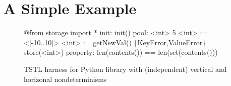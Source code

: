 \begin{comment}
\subsection{Tools for Nondeterministic Delta-Debugging}
\label{sec:ddimp}

Unlike the other additions, explicitly designed for nondeterminism
detection, the {\tt P} query, {\tt forceP} wrapper, and {\tt --probability}, {\tt
  --samples}, and {\tt --replications} reducer options are general
tools for use with nondeterministic predicates in delta-debugging.  Of
course, nondeterminism and flakiness are the most common probabilistic
test properties we are aware of, but in theory these tools can be used
for other probabilistic debugging problems (e.g., if the property of
interest is that a value is above a certain threshold in 90\% of test
executions, these TSTL additions can be used to find a small test where this property
fails to hold).  In addition to the basic probabilistic reduction
issues discussed above, actual implementation of test reduction for
nondeterminism introduces some subtle issues.  By default, for
example, TSTL automatically removed non-enabled actions from tests
during reduction, because these are never actually executed.  However,
in timing based nondeterminism, such steps may be essential to
causing the nondeterminism to appear (we had to turn off this feature
for the {\tt redis-py} example discussed below).

\subsection{Key Challenges}
The key challenge in all of these implementations was choosing
appropriate default values.  In particular, how many times to retry
tests (horizontal determinism) or actions (vertical/failure determinism), what delays to use, and numbers of replications
required in nondeterministic delta-debugging.  Because our confidence
that these defaults are ideal is low, we made it easy to change the
values used, as shown by the presence of command line options and
optional function parameters in Tables \ref{tab:methods} and
\ref{tab:options}.
\end{comment}

\section{A Simple Example}

\begin{figure}
{\scriptsize
\begin{code}
@from storage import *
\vspace{0.1in}
init: init()
\vspace{0.1in}
pool: <int> 5
\vspace{0.1in}
<int> := <[-10..10]>
<int> := getNewVal()
\{KeyError,ValueError\} store(<int>)
\vspace{0.1in}
property: len(contents()) == len(set(contents()))
\end{code}
}
\caption{TSTL harness for Python library with (independent) vertical and
  horizonal nondeterminisms}
\label{fig:simpleexample}
\end{figure}

